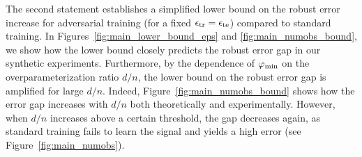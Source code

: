 The second statement establishes a simplified lower bound on the
robust error increase for adversarial training (for a fixed
$\epsilon_{\text{tr}} = \epsilon_{\text{te}}$)  compared to standard training.
In Figures~\ref{fig:main_lower_bound_eps}  and \ref{fig:main_numobs_bound}, we show how the lower bound closely
predicts the robust error gap in our synthetic experiments.
Furthermore, by the dependence of $\varphi_{\text{min}}$ on the overparameterization ratio $d/n$, the lower bound on the robust error gap is amplified for large $d/n$.
Indeed, Figure~\ref{fig:main_numobs_bound} shows how the error gap increases with $d/n$
both theoretically and experimentally. However, when $d/n$ increases above a certain threshold, the gap decreases again, as standard training fails to learn the signal and yields a high error (see Figure~\ref{fig:main_numobs}).






